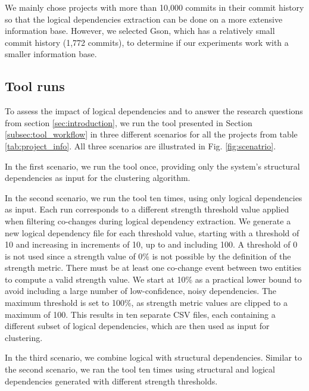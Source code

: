 \documentclass{ieeeaccess}
\begin{document}
We mainly chose projects with more than 10,000 commits in their commit history so that the logical dependencies extraction can be done on a more extensive information base. However, we selected Gson, which has a relatively small commit history (1,772 commits), to determine if our experiments work with a smaller information base.

\subsection{Tool runs}

To assess the impact of logical dependencies and to answer the research questions from section \ref{sec:introduction}, we run the tool presented in Section \ref{subsec:tool_workflow} in three different scenarios for all the projects from table \ref{tab:project_info}. All three scenarios are illustrated in Fig. \ref{fig:scenatrio}.

In the first scenario, we run the tool once, providing only the system's structural dependencies as input for the clustering algorithm.

In the second scenario, we run the tool ten times, using only logical dependencies as input. Each run corresponds to a different strength threshold value applied when filtering co-changes during logical dependency extraction. We generate a new logical dependency file for each threshold value, starting with a threshold of 10 and increasing in increments of 10, up to and including 100. A threshold of 0 is not used since a strength value of 0\% is not possible by the definition of the strength metric. There must be at least one co-change event between two entities to compute a valid strength value. We start at 10\% as a practical lower bound to avoid including a large number of low-confidence, noisy dependencies. The maximum threshold is set to 100\%, as strength metric values are clipped to a maximum of 100.
This results in ten separate CSV files, each containing a different subset of logical dependencies, which are then used as input for clustering.

In the third scenario, we combine logical with structural dependencies. Similar to the second scenario, we ran the tool ten times using structural and logical dependencies generated with different strength thresholds.
\end{document}
